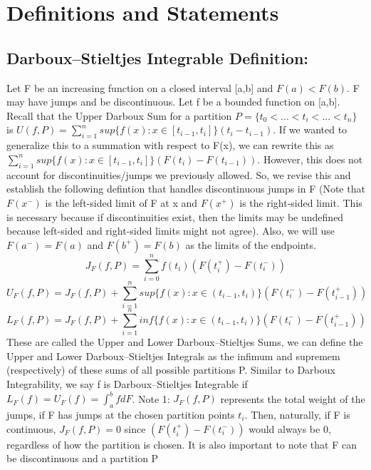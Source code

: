 \documentclass{report}
\begin{document}
\section{Definitions and Statements}

\subsection{Darboux–Stieltjes Integrable Definition:}
Let F be an increasing function on a closed interval [a,b] and \( F(a)
< F(b) \). F may have jumps and be discontinuous. Let f be a bounded 
function on [a,b].
\newline \newline
Recall that the Upper Darboux Sum for a partition $P = \{t_0 < ... < t_i < ... < t_n\}$ is  
$U(f,P) = \sum_{i=1}^{n} sup\{f(x): x \in [t_{i-1}, t_i] \}(t_i - t_{i-1}).$ If we wanted to generalize
this to a summation with respect to F(x), we can rewrite this as $\sum_{i=1}^{n} sup\{f(x): x \in [t_{i-1}, t_i] \}(F(t_i) - F(t_{i-1}))$. However, 
this does not account for discontinuities/jumps we previously allowed. So, we revise this and establish the following 
defintion that handles discontinuous jumps in F (Note that $F(x^-)$ is the left-sided
limit of F at x and $F(x^+)$ is the right-sided limit. This is necessary because if discontinuities exist,
then the limits may be undefined because left-sided and right-sided limits might not agree). Also, we will use 
$F(a^-) = F(a)$ and $F(b^+)=F(b)$ as the limits of the endpoints.
\[
    J_F(f, P) = \sum_{i=0}^{n} f(t_i)(F(t_i^+) - F(t_i^-))
\]
\[
    U_F(f, P) = J_F(f, P) + \sum_{i=1}^{n} sup\{f(x): x \in (t_{i-1}, t_i) \}(F(t_i^-) - F(t_{i-1}^+))
\]
\[
    L_F(f, P) = J_F(f, P) + \sum_{i=1}^{n} inf\{f(x): x \in (t_{i-1}, t_i) \}(F(t_i^-) - F(t_{i-1}^+))
\]
\newline \newline
These are called the Upper and Lower Darboux–Stieltjes Sums, we can define the Upper and Lower Darboux–Stieltjes 
Integrals as the infimum and supremem (respectively) of these sums of all possible partitions P. Similar to 
Darboux Integrability, we say f is Darboux–Stieltjes Integrable if $L_F(f) = U_F(f) = \int_{a}^{b}fdF$.
\newline \newline
Note 1: $J_F(f, P)$ represents the total weight of the jumps, if F has jumps at the chosen partition points $t_i$.
Then, naturally, if F is continuous, $J_F(f, P) = 0$ since $(F(t_i^+) - F(t_i^-))$ would always be 0, regardless
of how the partition is chosen. It is also important to note that F can be discontinuous and a partition P 
\end{document}

